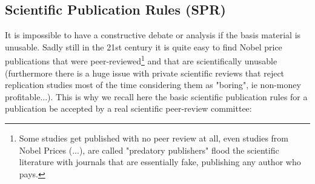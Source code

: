 	\subsection{Scientific Publication Rules (SPR)}\label{scientific publicatons rules}
	It is impossible to have a constructive debate or analysis if the basis material is unusable. Sadly still in the 21st century it is quite easy to find Nobel price publications that were peer-reviewed\footnote{Some studies get published with no peer review at all, even studies from Nobel Prices (...), are called "predatory publishers" flood the scientific literature with journals that are essentially fake, publishing any author who pays.} and that are scientifically unusable (furthermore there is a huge issue with private scientific reviews that reject replication studies most of the time considering them as "boring", ie non-money profitable...). This is why we recall here the basic scientific publication rules for a publication be accepted by a real scientific peer-review committee:

